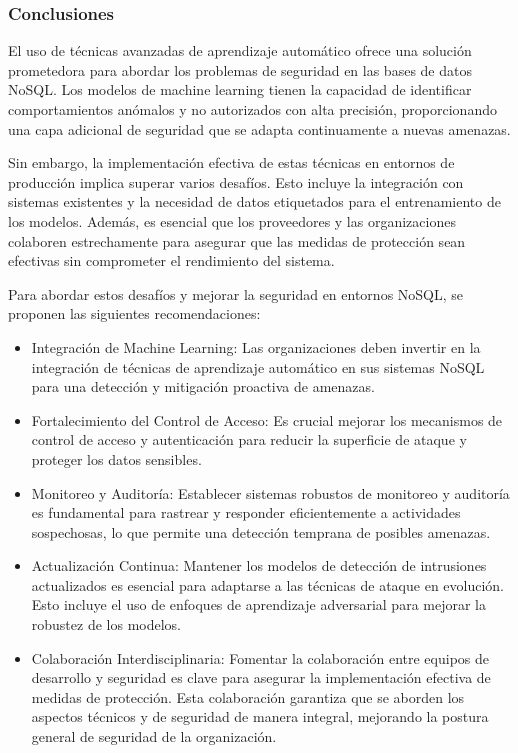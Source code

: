 \documentclass[pdflatex,sn-mathphys-num]{sn-jnl}
\theoremstyle{thmstyleone}%
\theoremstyle{thmstyletwo}%
\theoremstyle{thmstylethree}%
\begin{document}
\subsubsection{Conclusiones}

El uso de técnicas avanzadas de aprendizaje automático ofrece una solución prometedora para abordar los problemas de seguridad en las bases de datos NoSQL. Los modelos de machine learning tienen la capacidad de identificar comportamientos anómalos y no autorizados con alta precisión, proporcionando una capa adicional de seguridad que se adapta continuamente a nuevas amenazas.

Sin embargo, la implementación efectiva de estas técnicas en entornos de producción implica superar varios desafíos. Esto incluye la integración con sistemas existentes y la necesidad de datos etiquetados para el entrenamiento de los modelos. Además, es esencial que los proveedores y las organizaciones colaboren estrechamente para asegurar que las medidas de protección sean efectivas sin comprometer el rendimiento del sistema.

Para abordar estos desafíos y mejorar la seguridad en entornos NoSQL, se proponen las siguientes recomendaciones:

\begin{itemize}

    \item Integración de Machine Learning: Las organizaciones deben invertir en la integración de técnicas de aprendizaje automático en sus sistemas NoSQL para una detección y mitigación proactiva de amenazas.

    \item Fortalecimiento del Control de Acceso: Es crucial mejorar los mecanismos de control de acceso y autenticación para reducir la superficie de ataque y proteger los datos sensibles.

    \item Monitoreo y Auditoría: Establecer sistemas robustos de monitoreo y auditoría es fundamental para rastrear y responder eficientemente a actividades sospechosas, lo que permite una detección temprana de posibles amenazas.

    \item Actualización Continua: Mantener los modelos de detección de intrusiones actualizados es esencial para adaptarse a las técnicas de ataque en evolución. Esto incluye el uso de enfoques de aprendizaje adversarial para mejorar la robustez de los modelos.

    \item Colaboración Interdisciplinaria: Fomentar la colaboración entre equipos de desarrollo y seguridad es clave para asegurar la implementación efectiva de medidas de protección. Esta colaboración garantiza que se aborden los aspectos técnicos y de seguridad de manera integral, mejorando la postura general de seguridad de la organización.    
    
\end{itemize}
\end{document}

